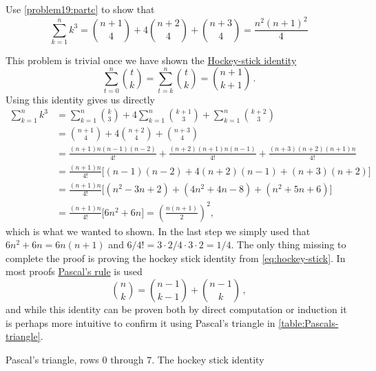 \documentclass[a4paper, english, 12pt]{article} %
\begin{document}
\begin{subproblem}
  Use \cref{problem19:partc} to show that
  \begin{equation*}
    \sum_{k = 1}^{n} k^3 = \binom{n+1}{4} + 4 \binom{n+2}{4} + \binom{n+3}{4} = \frac{n^2(n+1)^2}{4}
  \end{equation*}
\end{subproblem}

\begin{answer}
  This problem is trivial once we have shown the
  \href{https://en.wikipedia.org/wiki/Hockey-stick_identity}{Hockey-stick
    identity}
  \begin{equation}
    \label{eq:hockey-stick}
    \sum_{t = 0}^{n} \binom{t}{k} = \sum_{t = k}^{n} \binom{t}{k} = \binom{n+1}{k+1}\,.
  \end{equation}
  Using this identity gives us directly
  \begin{align*}
    \sum_{k = 1}^{n} k^3
    & = \sum_{k=1}^{n} \binom{k}{3} + 4\sum_{k=1}^{n} \binom{k+1}{3} + \sum_{k=1}^{n}\binom{k+2}{3} \\
    & = \binom{n+1}{4} + 4 \binom{n+2}{4} + \binom{n+3}{4} \\
    & = \frac{(n+1)n(n-1)(n-2)}{4!} + \frac{(n+2)(n+1)n(n-1)}{4!} + \frac{(n+3)(n+2)(n+1)n}{4!} \\
    & = \frac{(n+1)n}{4!}\bigl[ (n-1)(n-2) + 4(n+2)(n-1) + (n+3)(n+2) \bigr] \\
    & = \frac{(n+1)n}{4!}\bigl[ (n^2 - 3n + 2) + (4n^2 + 4n - 8) + (n^2 + 5n + 6) \bigr] \\
    & = \frac{(n+1)n}{4!}\bigl[ 6n^2 + 6n \bigr] 
      = \left( \frac{n(n+1)}{2} \right)^2,
  \end{align*}
  which is what we wanted to shown. In the last step we simply used that
  $6n^2+6n=6n(n+1)$ and $6/4! = 3\cdot 2 /4 \cdot 3 \cdot 2 = 1/4$.
  The only thing missing to complete the proof is proving the hockey stick
  identity from \cref{eq:hockey-stick}. In most proofs
  \href{https://en.wikipedia.org/wiki/Pascal\%27s_rule}{Pascal's rule} is used
  \begin{equation}
    \binom{n}{k} = \binom{n-1}{k-1} + \binom{n-1}{k}\,,
  \end{equation}
  and while this identity can be proven both by direct computation or induction
  it is perhaps more intuitive to confirm it using Pascal's triangle in
  \cref{table:Pascals-triangle}.
  \begin{table}[H]
    \centering
    \caption{Pascal's triangle, rows $0$ through $7$. The hockey stick identity
}
\end{table}
\end{answer}
\end{document}
